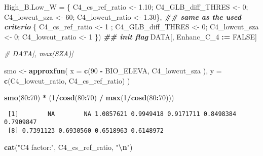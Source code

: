 \documentclass[
  10pt,
  a4paper,oneside]{article}
\newenvironment{Shaded}{\begin{snugshade}}{\end{snugshade}}
\newcommand{\AttributeTok}[1]{\textcolor[rgb]{0.13,0.29,0.53}{#1}}
\newcommand{\CommentTok}[1]{\textcolor[rgb]{0.56,0.35,0.01}{\textit{#1}}}
\newcommand{\ConstantTok}[1]{\textcolor[rgb]{0.56,0.35,0.01}{#1}}
\newcommand{\DecValTok}[1]{\textcolor[rgb]{0.00,0.00,0.81}{#1}}
\newcommand{\DocumentationTok}[1]{\textcolor[rgb]{0.56,0.35,0.01}{\textbf{\textit{#1}}}}
\newcommand{\FloatTok}[1]{\textcolor[rgb]{0.00,0.00,0.81}{#1}}
\newcommand{\FunctionTok}[1]{\textcolor[rgb]{0.13,0.29,0.53}{\textbf{#1}}}
\newcommand{\NormalTok}[1]{#1}
\newcommand{\OtherTok}[1]{\textcolor[rgb]{0.56,0.35,0.01}{#1}}
\newcommand{\SpecialCharTok}[1]{\textcolor[rgb]{0.81,0.36,0.00}{\textbf{#1}}}
\newcommand{\StringTok}[1]{\textcolor[rgb]{0.31,0.60,0.02}{#1}}
\begin{document}
\begin{Shaded}
\begin{Highlighting}[]
       \AttributeTok{High\_B.Low\_W    =}\NormalTok{ \{ C4\_cs\_ref\_ratio }\OtherTok{\textless{}{-}} \FloatTok{1.10}\NormalTok{; C4\_GLB\_diff\_THRES }\OtherTok{\textless{}{-}}  \DecValTok{0}\NormalTok{; C4\_lowcut\_sza }\OtherTok{\textless{}{-}} \DecValTok{60}\NormalTok{; C4\_lowcut\_ratio }\OtherTok{\textless{}{-}} \FloatTok{1.30}\NormalTok{\}, }\DocumentationTok{\#\# same as the used criterio}
\NormalTok{                         \{ C4\_cs\_ref\_ratio }\OtherTok{\textless{}{-}} \DecValTok{1}\NormalTok{   ; C4\_GLB\_diff\_THRES }\OtherTok{\textless{}{-}}  \DecValTok{0}\NormalTok{; C4\_lowcut\_sza }\OtherTok{\textless{}{-}}  \DecValTok{0}\NormalTok{; C4\_lowcut\_ratio }\OtherTok{\textless{}{-}} \DecValTok{1}\NormalTok{   \})}
\DocumentationTok{\#\# init flag}
\NormalTok{DATA[, Enhanc\_C\_4 }\SpecialCharTok{:=} \ConstantTok{FALSE}\NormalTok{]}

\CommentTok{\# DATA[, max(SZA)]}

\NormalTok{smo }\OtherTok{\textless{}{-}} \FunctionTok{approxfun}\NormalTok{(}
    \AttributeTok{x =} \FunctionTok{c}\NormalTok{(}\DecValTok{90} \SpecialCharTok{{-}}\NormalTok{ BIO\_ELEVA, C4\_lowcut\_sza  ),}
    \AttributeTok{y =} \FunctionTok{c}\NormalTok{(C4\_lowcut\_ratio,  C4\_cs\_ref\_ratio)}
\NormalTok{    )}

\FunctionTok{smo}\NormalTok{(}\DecValTok{80}\SpecialCharTok{:}\DecValTok{70}\NormalTok{) }\SpecialCharTok{*}\NormalTok{ (}\DecValTok{1}\SpecialCharTok{/}\FunctionTok{cosd}\NormalTok{(}\DecValTok{80}\SpecialCharTok{:}\DecValTok{70}\NormalTok{) }\SpecialCharTok{/} \FunctionTok{max}\NormalTok{(}\DecValTok{1}\SpecialCharTok{/}\FunctionTok{cosd}\NormalTok{(}\DecValTok{80}\SpecialCharTok{:}\DecValTok{70}\NormalTok{)))}
\end{Highlighting}
\end{Shaded}

\begin{verbatim}
 [1]        NA        NA 1.0857621 0.9949418 0.9171711 0.8498384 0.7909847
 [8] 0.7391123 0.6930560 0.6518963 0.6148972
\end{verbatim}

\begin{Shaded}
\begin{Highlighting}[]
\FunctionTok{cat}\NormalTok{(}\StringTok{"C4 factor:"}\NormalTok{, C4\_cs\_ref\_ratio,   }\StringTok{"}\SpecialCharTok{\textbackslash{}n}\StringTok{"}\NormalTok{)}
\end{Highlighting}
\end{Shaded}
\end{document}
